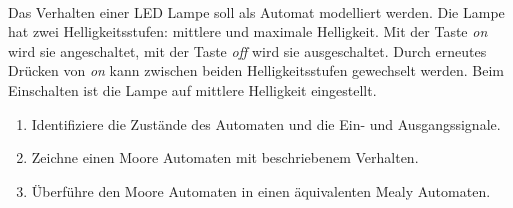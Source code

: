 \newcommand{\printpraesenzlsg}{false}
\newcommand{\printloesungen}{false}
\newcommand{\printbewertungen}{false}
\newcommand{\blattnummer}{3}

\usepackage[utf8]{inputenc}
\usepackage{array}


\iforiginal{}

	
\\
Das Verhalten einer LED Lampe soll als Automat modelliert werden. Die Lampe hat zwei Helligkeitsstufen:
mittlere und maximale Helligkeit. Mit der Taste \textit{on} wird sie angeschaltet, mit der Taste \textit{off} wird sie ausgeschaltet.
Durch erneutes Drücken von \textit{on} kann zwischen beiden Helligkeitsstufen gewechselt werden. Beim
Einschalten ist die Lampe auf mittlere Helligkeit eingestellt.
\begin{enumerate}
    \item Identifiziere die Zustände des Automaten und die Ein- und Ausgangssignale.
    \item Zeichne einen Moore Automaten mit beschriebenem Verhalten.
    \item Überführe den Moore Automaten in einen äquivalenten Mealy Automaten.
\end{enumerate}

